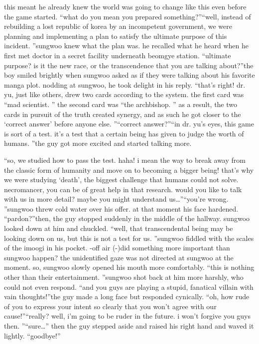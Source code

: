  this meant he already knew the world was going to change like this even before the game started.
“what do you mean you prepared something?”“well, instead of rebuilding a lost republic of korea by an incompetent government, we were planning and implementing a plan to satisfy the ultimate purpose of this incident.
”sungwoo knew what the plan was.
 he recalled what he heard when he first met doctor in a secret facility underneath beomgye station.
“ultimate purpose? is it the new race, or the transcendence that you are talking about?”the boy smiled brightly when sungwoo asked as if they were talking about his favorite manga plot.
 nodding at sungwoo, he took delight in his reply.
“that’s right! dr.
 yu, just like others, drew two cards according to the system.
 the first card was “mad scientist.
” the second card was “the archbishop.
” as a result, the two cards in pursuit of the truth created synergy, and as such he got closer to the ‘correct answer’ before anyone else.
”“correct answer?”“in dr.
 yu’s eyes, this game is sort of a test.
 it’s a test that a certain being has given to judge the worth of humans.
”the guy got more excited and started talking more.


“so, we studied how to pass the test.
 haha! i mean the way to break away from the classic form of humanity and move on to becoming a bigger being! that’s why we were studying ‘death’, the biggest challenge that humans could not solve.
 necromancer, you can be of great help in that research.
 would you like to talk with us in more detail? maybe you might understand us…”“you’re wrong.
”sungwoo threw cold water over his offer.
 at that moment his face hardened.
“pardon?”then, the guy stopped suddenly in the middle of the hallway.
sungwoo looked down at him and chuckled.
“well, that transcendental being may be looking down on us, but this is not a test for us.
”sungwoo fiddled with the scales of the imoogi in his pocket.
-off air (-)did something more important than sungwoo happen? the unidentified gaze was not directed at sungwoo at the moment.
so, sungwoo slowly opened his mouth more comfortably.
“this is nothing other than their entertainment.
”sungwoo shot back at him more harshly, who could not even respond.
“and you guys are playing a stupid, fanatical villain with vain thoughts!”the guy made a long face but responded cynically.
“oh, how rude of you to express your intent so clearly that you won’t agree with our cause!”“really? well, i’m going to be ruder in the future.
 i won’t forgive you guys then.
”“sure…” then the guy stepped aside and raised his right hand and waved it lightly.
“goodbye!”

 